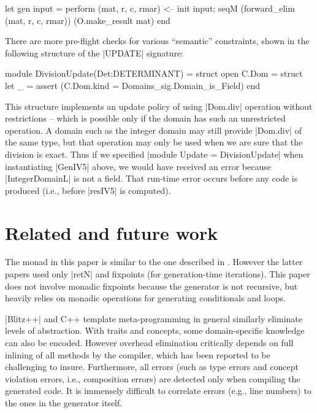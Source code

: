\documentclass[draft]{elsart}
\begin{document}
\begin{code2}
   let gen input = perform
          (mat, r, c, rmar) <-- init input;
          seqM 
            (forward_elim (mat, r, c, rmar))
            (O.make_result mat)
end
\end{code2}

There are more pre-flight checks for various ``semantic'' 
constraints, shown
in the following structure of the |UPDATE| signature:
\vspace*{-5pt}\begin{code}
module DivisionUpdate(Det:DETERMINANT) =
  struct
  open C.Dom = struct 
  let _ = assert (C.Dom.kind = Domains_sig.Domain_is_Field)
end
\end{code}
%
This structure implements an update policy of using
|Dom.div| operation without restrictions -- which is possible only if
the domain has such an unrestricted operation. A domain such as the integer
domain may still provide |Dom.div| of the same type, but that operation may
only be used when we are sure that the division is exact. Thus if we
specified |module Update = DivisionUpdate| when instantiating |GenIV5|
above, we would have received an error because |IntegerDomainL| is not
a field. That run-time error occurs before any code is produced (i.e.,
before |resIV5| is computed).


\section{Related and future work}\label{related}

The monad in this paper is similar to the one described in
\cite{MSP:PADL04,KiselyovTaha}.  However the latter papers used only
|retN| and fixpoints (for generation-time iterations).  This paper
does not involve monadic fixpoints because the generator is not
recursive, but heavily relies on monadic operations for generating
conditionals and loops.

|Blitz++| \cite{Veldhuizen:1998:ISCOPE} and {C++} template
meta-programming in general similarly eliminate levels
of abstraction.  With traits and concepts, some domain-specific
knowledge can also be encoded.  However overhead elimination
critically depends on full inlining of all methods by the compiler,
which has been reported to be challenging to insure. Furthermore, all
errors (such as type errors and concept violation errors, i.e.,
composition errors) are detected only when compiling the generated
code. It is immensely difficult to correlate errors (e.g., line
numbers) to the ones in the generator itself.
\end{document}
